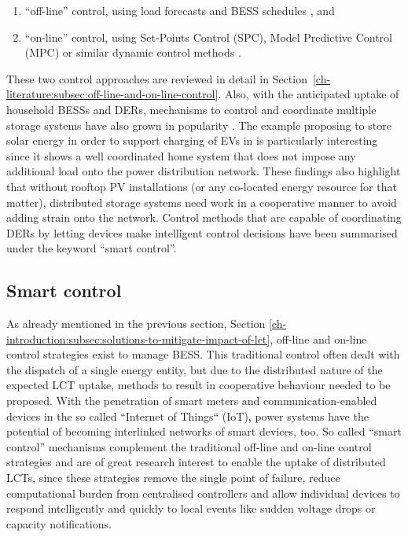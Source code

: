 \begin{enumerate}
	\item ``off-line'' control, using load forecasts and BESS schedules \cite{Cecati2011, Chaouachi2013, Palma-Behnke2013, Khodaei2014}, and
	\item ``on-line'' control, using Set-Points Control (SPC), Model Predictive Control (MPC) or similar dynamic control methods \cite{Salinas2013, Huang2013, Huang2014a, Sun2014a}.
\end{enumerate}

These two control approaches are reviewed in detail in Section \ref{ch-literature:subsec:off-line-and-on-line-control}.
Also, with the anticipated uptake of household BESSs and DERs, mechanisms to control and coordinate multiple storage systems have also grown in popularity \cite{Mokhtari2013, Sarker2015, Baker2016a, Baumann2017}.
The example proposing to store solar energy in order to support charging of EVs in \cite{Baumann2017} is particularly interesting since it shows a well coordinated home system that does not impose any additional load onto the power distribution network.
These findings also highlight that without rooftop PV installations (or any co-located energy resource for that matter), distributed storage systems need work in a cooperative manner to avoid adding strain onto the network.
Control methods that are capable of coordinating DERs by letting devices make intelligent control decisions have been summarised under the keyword ``smart control''.

\subsection{Smart control}
\label{ch-introduction:subsec:smart-control}


As already mentioned in the previous section, Section \ref{ch-introduction:subsec:solutions-to-mitigate-impact-of-lct}, off-line and on-line control strategies exist to manage BESS.
This traditional control often dealt with the dispatch of a single energy entity, but due to the distributed nature of the expected LCT uptake, methods to result in cooperative behaviour needed to be proposed.
With the penetration of smart meters and communication-enabled devices in the so called ``Internet of Things`` (IoT), power systems have the potential of becoming interlinked networks of smart devices, too.
So called ``smart control'' mechanisms complement the traditional off-line and on-line control strategies and are of great research interest to enable the uptake of distributed LCTs, since these strategies remove the single point of failure, reduce computational burden from centralised controllers and allow individual devices to respond intelligently and quickly to local events like sudden voltage drops or capacity notifications.

